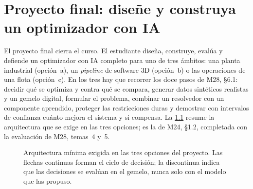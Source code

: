 \chapter{Proyecto final: diseñe y construya un optimizador con IA}
\label{cap:proyecto}

El proyecto final cierra el curso. El estudiante diseña, construye, evalúa y defiende un optimizador con IA completo para uno de tres ámbitos: una planta industrial (opción~a), un \emph{pipeline} de software 3D (opción~b) o las operaciones de una flota (opción~c). En los tres hay que recorrer los doce pasos de M28, §6.1: decidir qué se optimiza y contra qué se compara, generar datos sintéticos realistas y un gemelo digital, formular el problema, combinar un resolvedor con un componente aprendido, proteger las restricciones duras y demostrar con intervalos de confianza cuánto mejora el sistema y si compensa. La \cref{fig:arquitectura} resume la arquitectura que se exige en las tres opciones; es la de M24, §1.2, completada con la evaluación de M28, temas~4 y~5.

\begin{figure}[h]
\centering
{}
\caption{Arquitectura mínima exigida en las tres opciones del proyecto. Las flechas continuas forman el ciclo de decisión; la discontinua indica que las decisiones se evalúan en el gemelo, nunca solo con el modelo que las propuso.}
\label{fig:arquitectura}
\end{figure}

